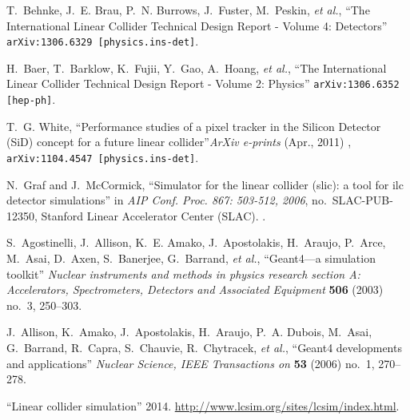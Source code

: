\documentclass[12pt]{article}
\begin{document}
%
%
%
%
%
%
%
%

\begin{footnotesize}
%
%
\providecommand{\href}[2]{#2}\begingroup\raggedright\begin{thebibliography}{10}

T.~Behnke, J.~E. Brau, P.~N. Burrows, J.~Fuster, M.~Peskin, {\em et al.},
  ``{The International Linear Collider Technical Design Report - Volume 4:
  Detectors}''
\href{http://arxiv.org/abs/1306.6329}{{\tt arXiv:1306.6329 [physics.ins-det]}}.

H.~Baer, T.~Barklow, K.~Fujii, Y.~Gao, A.~Hoang, {\em et al.}, ``{The
  International Linear Collider Technical Design Report - Volume 2: Physics}''
\href{http://arxiv.org/abs/1306.6352}{{\tt arXiv:1306.6352 [hep-ph]}}.

T.~G. {White}, ``{Performance studies of a pixel tracker in the Silicon
  Detector (SiD) concept for a future linear collider}''{\em ArXiv e-prints}
  (Apr., 2011)  , \href{http://arxiv.org/abs/1104.4547}{{\tt arXiv:1104.4547
  [physics.ins-det]}}.

N.~Graf and J.~McCormick, ``Simulator for the linear collider (slic): a tool
  for ilc detector simulations'' in {\em AIP Conf. Proc. 867: 503-512, 2006},
  no.~SLAC-PUB-12350, Stanford Linear Accelerator Center (SLAC).
.

S.~Agostinelli, J.~Allison, K.~E. Amako, J.~Apostolakis, H.~Araujo, P.~Arce,
  M.~Asai, D.~Axen, S.~Banerjee, G.~Barrand, {\em et al.}, ``Geant4—a
  simulation toolkit'' {\em Nuclear instruments and methods in physics research
  section A: Accelerators, Spectrometers, Detectors and Associated Equipment}
  {\bf 506} (2003) no.~3, 250--303.

J.~Allison, K.~Amako, J.~Apostolakis, H.~Araujo, P.~A. Dubois, M.~Asai,
  G.~Barrand, R.~Capra, S.~Chauvie, R.~Chytracek, {\em et al.}, ``Geant4
  developments and applications'' {\em Nuclear Science, IEEE Transactions on}
  {\bf 53} (2006) no.~1, 270--278.

``Linear collider simulation'' 2014.
\newblock \url{http://www.lcsim.org/sites/lcsim/index.html}.


\end{thebibliography}
\end{footnotesize}
\end{document}
